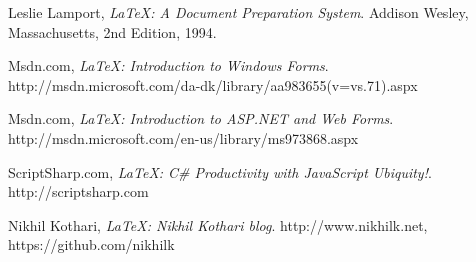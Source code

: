\begin{thebibliography}{9}
  Leslie Lamport,
  \emph{\LaTeX: A Document Preparation System}.
  Addison Wesley, Massachusetts,
  2nd Edition,
  1994.


  Msdn.com,
  \emph{\LaTeX: Introduction to Windows Forms}.
  http://msdn.microsoft.com/da-dk/library/aa983655(v=vs.71).aspx

  Msdn.com,
  \emph{\LaTeX: Introduction to ASP.NET and Web Forms}.
  http://msdn.microsoft.com/en-us/library/ms973868.aspx

  ScriptSharp.com,
  \emph{\LaTeX: C\# Productivity with JavaScript Ubiquity!}.
  http://scriptsharp.com

  Nikhil Kothari,
  \emph{\LaTeX: Nikhil Kothari blog}.
  http://www.nikhilk.net, https://github.com/nikhilk
\end{thebibliography}









